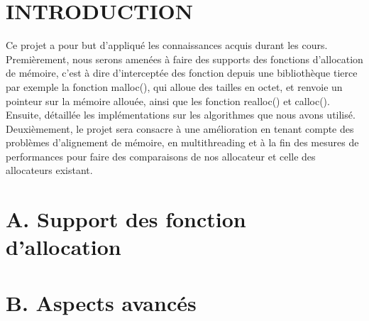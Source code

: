 \documentclass[11pt]{article}
\begin{document}
\section{INTRODUCTION}
\qquad Ce projet a pour but d'appliqué les connaissances acquis durant les cours. Premièrement, nous serons amenées à faire des supports des fonctions d'allocation de mémoire, c'est à dire d'interceptée des fonction depuis une bibliothèque tierce par exemple la fonction  malloc(), qui alloue des tailles en octet, et renvoie un pointeur sur la mémoire allouée, ainsi que les fonction realloc() et calloc(). Ensuite, détaillée les implémentations sur les algorithmes que nous avons utilisé. Deuxièmement, le projet sera consacre à une amélioration en tenant compte des problèmes d'alignement de mémoire, en multithreading et à la fin des mesures de performances pour faire des comparaisons de nos allocateur et celle des allocateurs existant.

\section{A. Support des fonction d'allocation}



\section{B. Aspects avancés}
\end{document}
